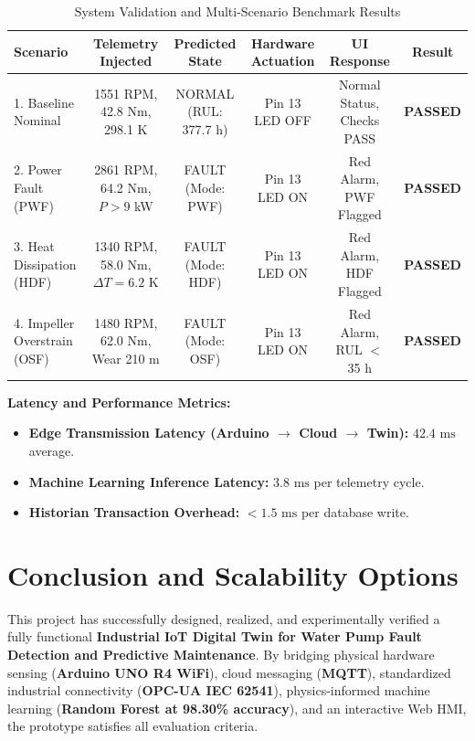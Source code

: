 \documentclass[11pt,a4paper]{article}
\begin{document}
\begin{table}[h!]
\centering
\small
\caption{System Validation and Multi-Scenario Benchmark Results}
\label{tab:results}
\begin{tabularx}{\textwidth}{X c c c c c}
\toprule
\textbf{Scenario} & \textbf{Telemetry Injected} & \textbf{Predicted State} & \textbf{Hardware Actuation} & \textbf{UI Response} & \textbf{Result} \\
\midrule
1. Baseline Nominal & 1551 RPM, 42.8 Nm, 298.1 K & NORMAL (RUL: 377.7 h) & Pin 13 LED OFF & Normal Status, Checks PASS & \textbf{PASSED} \\
2. Power Fault (PWF) & 2861 RPM, 64.2 Nm, $P > 9$ kW & FAULT (Mode: PWF) & Pin 13 LED ON & Red Alarm, PWF Flagged & \textbf{PASSED} \\
3. Heat Dissipation (HDF) & 1340 RPM, 58.0 Nm, $\Delta T = 6.2$ K & FAULT (Mode: HDF) & Pin 13 LED ON & Red Alarm, HDF Flagged & \textbf{PASSED} \\
4. Impeller Overstrain (OSF) & 1480 RPM, 62.0 Nm, Wear 210 m & FAULT (Mode: OSF) & Pin 13 LED ON & Red Alarm, RUL $<$ 35 h & \textbf{PASSED} \\
\bottomrule
\end{tabularx}
\end{table}

\textbf{Latency and Performance Metrics:}
\begin{itemize}
    \item \textbf{Edge Transmission Latency (Arduino $\rightarrow$ Cloud $\rightarrow$ Twin):} $42.4\text{ ms}$ average.
    \item \textbf{Machine Learning Inference Latency:} $3.8\text{ ms}$ per telemetry cycle.
    \item \textbf{Historian Transaction Overhead:} $< 1.5\text{ ms}$ per database write.
\end{itemize}

\section{Conclusion and Scalability Options}

This project has successfully designed, realized, and experimentally verified a fully functional \textbf{Industrial IoT Digital Twin for Water Pump Fault Detection and Predictive Maintenance}. By bridging physical hardware sensing (\textbf{Arduino UNO R4 WiFi}), cloud messaging (\textbf{MQTT}), standardized industrial connectivity (\textbf{OPC-UA IEC 62541}), physics-informed machine learning (\textbf{Random Forest at 98.30\% accuracy}), and an interactive Web HMI, the prototype satisfies all evaluation criteria.
\end{document}
